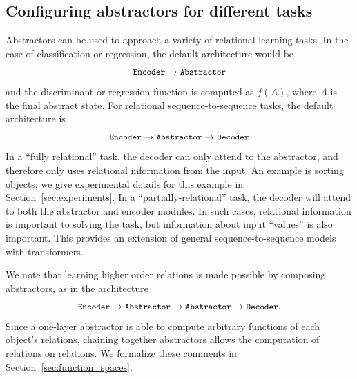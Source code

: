 \subsection{Configuring abstractors for different tasks}
\def\module#1{\mbox{\small\texttt{#1}}}

Abstractors can be used to approach a variety of relational learning tasks. In the case of classification 
or regression, the default architecture would be 
$$\module{Encoder} \rightarrow \module{Abstractor}$$
and the discriminant or regression function is computed as $f(A)$, where $A$ is the final abstract state.
For relational sequence-to-sequence tasks, the default architecture is 
$$\module{Encoder} \rightarrow \module{Abstractor} \rightarrow \module{Decoder}$$
In a ``fully relational'' task, the decoder can only attend to the abstractor, and therefore 
only uses relational information from the input. An example is sorting objects; we give 
experimental details for this example in Section~\ref{sec:experiments}.
In a ``partially-relational'' task, the decoder will attend to both the abstractor and encoder modules. In such cases, relational information is important to solving the task, but information about input ``values'' is 
also important. This provides an extension of general sequence-to-sequence models with transformers.


We note that learning higher order relations is made possible by composing 
abstractors, as in the architecture
$$\module{Encoder} \rightarrow \module{Abstractor} \rightarrow \module{Abstractor} \rightarrow \module{Decoder}.$$
Since a one-layer abstractor is able to compute arbitrary functions of each object's relations, 
chaining together abstractors allows the computation of relations on relations. We formalize 
these comments in Section~\ref{sec:function_spaces}.


